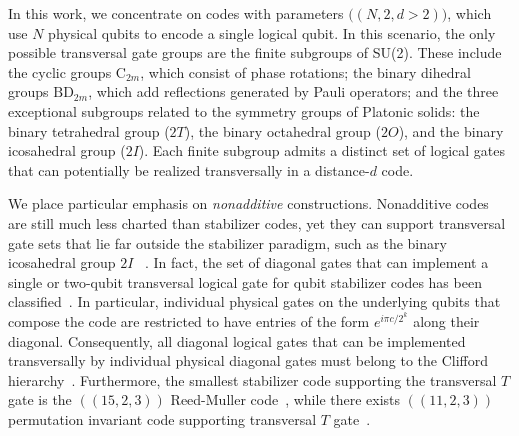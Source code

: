 \documentclass[8pt]{article}
\theoremstyle{definition}
\begin{document}
In this work, we concentrate on codes with parameters \(\bigl((N,2,d>2)\bigr)\),
which use \(N\) physical qubits to encode a single logical qubit. In this scenario, the only possible transversal gate groups are the finite subgroups of SU(2). These include the cyclic groups \(\mathrm{C}_{2m}\), which consist of phase rotations; the binary dihedral groups \(\mathrm{BD}_{2m}\), which add reflections generated by Pauli operators; and the three exceptional subgroups related to the symmetry groups of Platonic solids: the binary tetrahedral group (\(2T\)), the binary octahedral group (\(2O\)), and the binary icosahedral group (\(2I\)). Each finite subgroup admits a distinct set of logical gates that can potentially be realized transversally in a distance-\(d\) code.

We place particular emphasis on \emph{nonadditive} constructions. Nonadditive codes~\cite{rains1997nonadditive,roychowdhury1997structure,grassl1997note,arvind2002nonstabilizer,aggarwal2008boolean,ni2015non,webster2022xp} are
still much less charted than stabilizer codes, yet they can support
transversal gate sets that lie far outside the stabilizer paradigm, such as the binary icosahedral group $2I$ ~\cite{kubischta2023family}.
In fact,  the set of diagonal gates that can implement a single or two-qubit transversal
logical gate for qubit stabilizer codes has been classified~\cite{zeng2011transversality,anderson2016classification}.
In particular, individual physical gates on the underlying
qubits that compose the code are restricted to have entries of the form $e^{i\pi c/2^k}$
along their diagonal. Consequently, all diagonal logical gates that can be implemented transversally by individual
physical diagonal gates must belong to the Clifford hierarchy~\cite{anderson2016classification}. Furthermore,
the smallest stabilizer code supporting the transversal $T$ gate is the $((15,2,3))$ Reed-Muller code~\cite{koutsioumpas2024quantum},
while there exists $((11,2,3))$ permutation invariant code supporting transversal $T$ gate~\cite{kubischta2024permutationinvariantquantumcodestransversal}.
\end{document}
